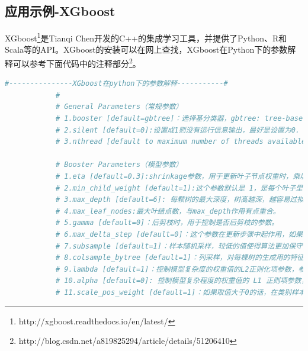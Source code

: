         \subsection{应用示例-XGboost}
            \par
            XGboost\footnote{http://xgboost.readthedocs.io/en/latest/}是Tianqi Chen开发的C++的集成学习工具，并提供了Python、R和Scala等的API。XGboost的安装可以在网上查找，XGboost在Python下的参数解释可以参考下面代码中的注释部分\footnote{http://blog.csdn.net/a819825294/article/details/51206410}。
            \begin{lstlisting}[language = Python]
            #---------------XGboost在python下的参数解释-----------#
            #
            # General Parameters（常规参数）
            # 1.booster [default=gbtree]：选择基分类器，gbtree: tree-based models/gblinear: linear models
            # 2.silent [default=0]:设置成1则没有运行信息输出，最好是设置为0.
            # 3.nthread [default to maximum number of threads available if not set]：线程数

            # Booster Parameters（模型参数）
            # 1.eta [default=0.3]:shrinkage参数，用于更新叶子节点权重时，乘以该系数，避免步长过大。参数值越大，越可能无法收敛。把学习率 eta 设置的小一些，小学习率可以使得后面的学习更加仔细。
            # 2.min_child_weight [default=1]:这个参数默认是 1，是每个叶子里面 h 的和至少是多少，对正负样本不均衡时的 0-1 分类而言，假设 h 在 0.01 附近，min_child_weight 为 1 意味着叶子节点中最少需要包含 100 个样本。这个参数非常影响结果，控制叶子节点中二阶导的和的最小值，该参数值越小，越容易 overfitting。
            # 3.max_depth [default=6]: 每颗树的最大深度，树高越深，越容易过拟合。
            # 4.max_leaf_nodes:最大叶结点数，与max_depth作用有点重合。
            # 5.gamma [default=0]：后剪枝时，用于控制是否后剪枝的参数。
            # 6.max_delta_step [default=0]：这个参数在更新步骤中起作用，如果取0表示没有约束，如果取正值则使得更新步骤更加保守。可以防止做太大的更新步子，使更新更加平缓。
            # 7.subsample [default=1]：样本随机采样，较低的值使得算法更加保守，防止过拟合，但是太小的值也会造成欠拟合。
            # 8.colsample_bytree [default=1]：列采样，对每棵树的生成用的特征进行列采样.一般设置为： 0.5-1
            # 9.lambda [default=1]：控制模型复杂度的权重值的L2正则化项参数，参数越大，模型越不容易过拟合。
            # 10.alpha [default=0]: 控制模型复杂程度的权重值的 L1 正则项参数，参数值越大，模型越不容易过拟合。
            # 11.scale_pos_weight [default=1]：如果取值大于0的话，在类别样本不平衡的情况下有助于快速收敛。


\end{lstlisting}
